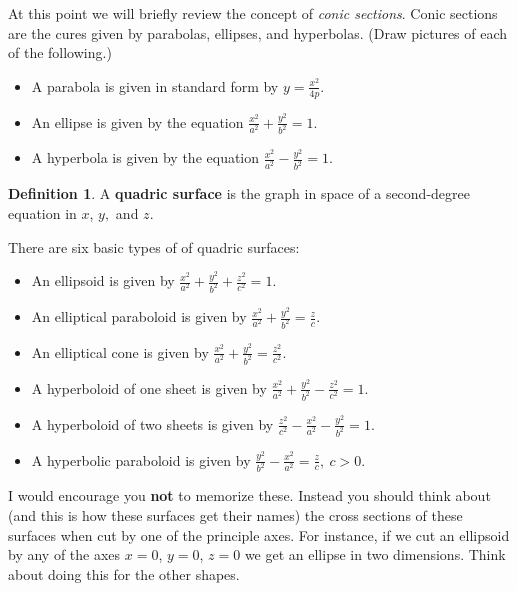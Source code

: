 \documentclass[12pt, letter]{article}
\theoremstyle{plain}
\numberwithin{theorem}{section}
\theoremstyle{definition}
\newtheorem{definition}[theorem]{Definition}
\begin{document}
At this point we will briefly review the concept of \textit{conic sections}. Conic sections are the cures given by parabolas, ellipses, and hyperbolas. (Draw pictures of each of the following.)
\begin{itemize}
\item A parabola is given in standard form by $y=\frac{x^2}{4p}$.
\item An ellipse is given by the equation $\frac{x^2}{a^2}+\frac{y^2}{b^2} = 1$.
\item A hyperbola is given by the equation $\frac{x^2}{a^2}-\frac{y^2}{b^2} = 1$.
\end{itemize}

\bigskip

\hrulefill

\bigskip

\begin{definition}
A \textbf{quadric surface} is the graph in space of a second-degree equation in $x$, $y,$ and $z$.
\end{definition}

\bigskip

There are six basic types of of quadric surfaces:
\begin{itemize}
\item An ellipsoid is given by $\frac{x^2}{a^2} + \frac{y^2}{b^2} + \frac{z^2}{c^2} = 1$.
\item An elliptical paraboloid is given by $\frac{x^2}{a^2} + \frac{y^2}{b^2} = \frac{z}{c}$.
\item An elliptical cone is given by $\frac{x^2}{a^2} + \frac{y^2}{b^2} = \frac{z^2}{c^2}$.
\item A hyperboloid of one sheet is given by $\frac{x^2}{a^2} + \frac{y^2}{b^2} - \frac{z^2}{c^2} = 1$.
\item A hyperboloid of two sheets is given by $\frac{z^2}{c^2} - \frac{x^2}{a^2} - \frac{y^2}{b^2} = 1$.
\item A hyperbolic paraboloid is given by $\frac{y^2}{b^2} - \frac{x^2}{a^2} = \frac{z}{c}, \ c>0$.
\end{itemize}

\bigskip

I would encourage you \textbf{not} to memorize these. Instead you should think about (and this is how these surfaces get their names) the cross sections of these surfaces when cut by one of the principle axes. For instance, if we cut an ellipsoid by any of the axes $x=0$, $y=0$, $z=0$ we get an ellipse in two dimensions. Think about doing this for the other shapes.
\end{document}
